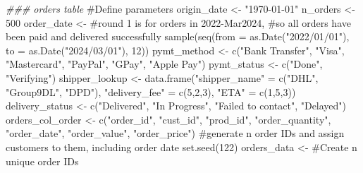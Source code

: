 \documentclass[
  letterpaper,
  DIV=11,
  numbers=noendperiod]{scrartcl}
\newenvironment{Shaded}{\begin{snugshade}}{\end{snugshade}}
\newcommand{\AttributeTok}[1]{\textcolor[rgb]{0.40,0.45,0.13}{#1}}
\newcommand{\CommentTok}[1]{\textcolor[rgb]{0.37,0.37,0.37}{#1}}
\newcommand{\DecValTok}[1]{\textcolor[rgb]{0.68,0.00,0.00}{#1}}
\newcommand{\DocumentationTok}[1]{\textcolor[rgb]{0.37,0.37,0.37}{\textit{#1}}}
\newcommand{\FunctionTok}[1]{\textcolor[rgb]{0.28,0.35,0.67}{#1}}
\newcommand{\NormalTok}[1]{\textcolor[rgb]{0.00,0.23,0.31}{#1}}
\newcommand{\OtherTok}[1]{\textcolor[rgb]{0.00,0.23,0.31}{#1}}
\newcommand{\StringTok}[1]{\textcolor[rgb]{0.13,0.47,0.30}{#1}}
\begin{document}
\begin{Shaded}
\begin{Highlighting}[numbers=left,,]
\DocumentationTok{\#\#\# \textquotesingle{}orders\textquotesingle{} table}
\CommentTok{\#Define parameters}
\NormalTok{origin\_date }\OtherTok{\textless{}{-}} \StringTok{"1970{-}01{-}01"}
\NormalTok{n\_orders }\OtherTok{\textless{}{-}} \DecValTok{500}
\NormalTok{order\_date }\OtherTok{\textless{}{-}} 
  \CommentTok{\#round 1 is for orders in 2022{-}Mar\textquotesingle{}2024, }
  \CommentTok{\#so all orders have been paid and delivered successfully}
  \FunctionTok{sample}\NormalTok{(}\FunctionTok{seq}\NormalTok{(}\AttributeTok{from =} \FunctionTok{as.Date}\NormalTok{(}\StringTok{"2022/01/01"}\NormalTok{), }
             \AttributeTok{to =} \FunctionTok{as.Date}\NormalTok{(}\StringTok{"2024/03/01"}\NormalTok{), }\DecValTok{12}\NormalTok{))}
\NormalTok{pymt\_method }\OtherTok{\textless{}{-}} 
  \FunctionTok{c}\NormalTok{(}\StringTok{"Bank Transfer"}\NormalTok{, }\StringTok{"Visa"}\NormalTok{, }\StringTok{"Mastercard"}\NormalTok{, }\StringTok{"PayPal"}\NormalTok{, }\StringTok{"GPay"}\NormalTok{, }\StringTok{"Apple Pay"}\NormalTok{)}
\NormalTok{pymt\_status }\OtherTok{\textless{}{-}} \FunctionTok{c}\NormalTok{(}\StringTok{"Done"}\NormalTok{, }\StringTok{"Verifying"}\NormalTok{)}
\NormalTok{shipper\_lookup }\OtherTok{\textless{}{-}} 
  \FunctionTok{data.frame}\NormalTok{(}\StringTok{"shipper\_name"} \OtherTok{=} \FunctionTok{c}\NormalTok{(}\StringTok{"DHL"}\NormalTok{, }\StringTok{"Group9DL"}\NormalTok{, }\StringTok{"DPD"}\NormalTok{),}
             \StringTok{"delivery\_fee"} \OtherTok{=} \FunctionTok{c}\NormalTok{(}\DecValTok{5}\NormalTok{,}\DecValTok{2}\NormalTok{,}\DecValTok{3}\NormalTok{),}
             \StringTok{"ETA"} \OtherTok{=} \FunctionTok{c}\NormalTok{(}\DecValTok{1}\NormalTok{,}\DecValTok{5}\NormalTok{,}\DecValTok{3}\NormalTok{))}
\NormalTok{delivery\_status }\OtherTok{\textless{}{-}} \FunctionTok{c}\NormalTok{(}\StringTok{"Delivered"}\NormalTok{, }\StringTok{"In Progress"}\NormalTok{, }
                     \StringTok{"Failed to contact"}\NormalTok{, }\StringTok{"Delayed"}\NormalTok{)}
\NormalTok{orders\_col\_order }\OtherTok{\textless{}{-}} 
  \FunctionTok{c}\NormalTok{(}\StringTok{"order\_id"}\NormalTok{, }\StringTok{"cust\_id"}\NormalTok{, }\StringTok{"prod\_id"}\NormalTok{, }\StringTok{"order\_quantity"}\NormalTok{,}
    \StringTok{"order\_date"}\NormalTok{, }\StringTok{"order\_value"}\NormalTok{, }\StringTok{"order\_price"}\NormalTok{)}
\CommentTok{\#generate n order IDs and assign customers to them, including order date}
\FunctionTok{set.seed}\NormalTok{(}\DecValTok{122}\NormalTok{)}
\NormalTok{orders\_data }\OtherTok{\textless{}{-}} 
  \CommentTok{\#Create n unique order IDs}

\end{Highlighting}
\end{Shaded}
\end{document}
